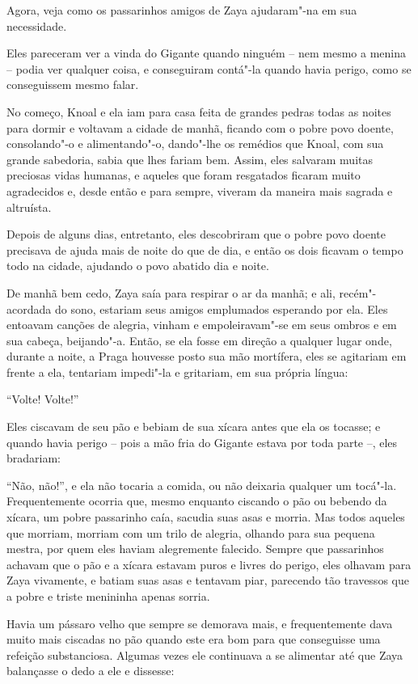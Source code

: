 Agora, veja como os passarinhos amigos de Zaya ajudaram"-na em sua
necessidade.

Eles pareceram ver a vinda do Gigante quando ninguém -- nem mesmo a
menina -- podia ver qualquer coisa, e conseguiram contá"-la quando havia
perigo, como se conseguissem mesmo falar.

No começo, Knoal e ela iam para casa feita de grandes pedras todas as
noites para dormir e voltavam a cidade de manhã, ficando com o pobre
povo doente, consolando"-o e alimentando"-o, dando"-lhe os remédios que
Knoal, com sua grande sabedoria, sabia que lhes fariam bem. Assim, eles
salvaram muitas preciosas vidas humanas, e aqueles que foram resgatados
ficaram muito agradecidos e, desde então e para sempre, viveram da
maneira mais sagrada e altruísta.

Depois de alguns dias, entretanto, eles descobriram que o pobre povo
doente precisava de ajuda mais de noite do que de dia, e então os dois
ficavam o tempo todo na cidade, ajudando o povo abatido dia e noite.

De manhã bem cedo, Zaya saía para respirar o ar da manhã; e ali,
recém"-acordada do sono, estariam seus amigos emplumados esperando por
ela. Eles entoavam canções de alegria, vinham e empoleiravam"-se em seus
ombros e em sua cabeça, beijando"-a. Então, se ela fosse em direção a
qualquer lugar onde, durante a noite, a Praga houvesse posto sua mão
mortífera, eles se agitariam em frente a ela, tentariam impedi"-la e
gritariam, em sua própria língua:

``Volte! Volte!''

Eles ciscavam de seu pão e bebiam de sua xícara antes que ela os
tocasse; e quando havia perigo -- pois a mão fria do Gigante estava por
toda parte --, eles bradariam:

``Não, não!'', e ela não tocaria a comida, ou não deixaria qualquer um
tocá"-la. Frequentemente ocorria que, mesmo enquanto ciscando o pão ou
bebendo da xícara, um pobre passarinho caía, sacudia suas asas e morria.
Mas todos aqueles que morriam, morriam com um trilo de alegria, olhando
para sua pequena mestra, por quem eles haviam alegremente falecido.
Sempre que passarinhos achavam que o pão e a xícara estavam puros e
livres do perigo, eles olhavam para Zaya vivamente, e batiam suas asas e
tentavam piar, parecendo tão travessos que a pobre e triste menininha
apenas sorria.

Havia um pássaro velho que sempre se demorava mais, e frequentemente
dava muito mais ciscadas no pão quando este era bom para que conseguisse
uma refeição substanciosa. Algumas vezes ele continuava a se alimentar
até que Zaya balançasse o dedo a ele e dissesse:

